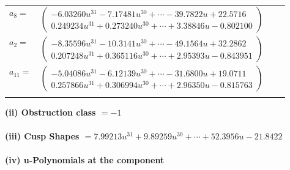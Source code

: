 \documentclass[1p]{elsarticle_modified}
\theoremstyle{definition}
\begin{document}
\begin{tabular}{m{7pt} m{180pt} m{7pt} m{180pt} }
\flushright $a_{8}=$&$\begin{pmatrix}-6.03260 u^{31}-7.17481 u^{30}+\cdots-39.7822 u+22.5716\\0.249234 u^{31}+0.273240 u^{30}+\cdots+3.38846 u-0.802100\end{pmatrix}$ \\
\flushright $a_{2}=$&$\begin{pmatrix}-8.35596 u^{31}-10.3141 u^{30}+\cdots-49.1564 u+32.2862\\0.207248 u^{31}+0.365116 u^{30}+\cdots+2.95393 u-0.843951\end{pmatrix}$ \\
\flushright $a_{11}=$&$\begin{pmatrix}-5.04086 u^{31}-6.12139 u^{30}+\cdots-31.6800 u+19.0711\\0.257866 u^{31}+0.306994 u^{30}+\cdots+2.96350 u-0.815763\end{pmatrix}$\\&\end{tabular}
\flushleft \textbf{(ii) Obstruction class $= -1$}\\~\\
\flushleft \textbf{(iii) Cusp Shapes $= 7.99213 u^{31}+9.89259 u^{30}+\cdots+52.3956 u-21.8422$}\\~\\
\newpage\renewcommand{\arraystretch}{1}
\flushleft \textbf{(iv) u-Polynomials at the component}\newline \\
\end{document}
